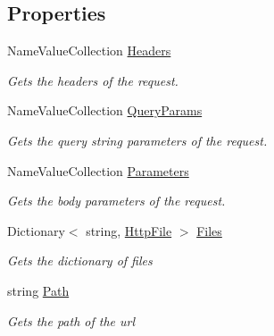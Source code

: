 \subsection*{Properties}
\begin{DoxyCompactItemize}
\item 
Name\+Value\+Collection \hyperlink{class_mvc_1_1_request_a98ac9e3caa73bc6512a760ed44d82a33}{Headers}
\begin{DoxyCompactList}\small\item\em Gets the headers of the request. \end{DoxyCompactList}\item 
Name\+Value\+Collection \hyperlink{class_mvc_1_1_request_a5ed7768ef9fa97d550a09186e1272f5b}{Query\+Params}
\begin{DoxyCompactList}\small\item\em Gets the query string parameters of the request. \end{DoxyCompactList}\item 
Name\+Value\+Collection \hyperlink{class_mvc_1_1_request_a26c0fa235c232271f53eb6ca20da121d}{Parameters}
\begin{DoxyCompactList}\small\item\em Gets the body parameters of the request. \end{DoxyCompactList}\item 
Dictionary$<$ string, \hyperlink{class_mvc_1_1_http_file}{Http\+File} $>$ \hyperlink{class_mvc_1_1_request_aac2c6182ecc7705b2e8cc011cdf53fea}{Files}
\begin{DoxyCompactList}\small\item\em Gets the dictionary of files \end{DoxyCompactList}\item 
string \hyperlink{class_mvc_1_1_request_ab12e18ae01b18842ea97d8dc5ea8b9f9}{Path}
\begin{DoxyCompactList}\small\item\em Gets the path of the url \end{DoxyCompactList}\end{DoxyCompactItemize}


